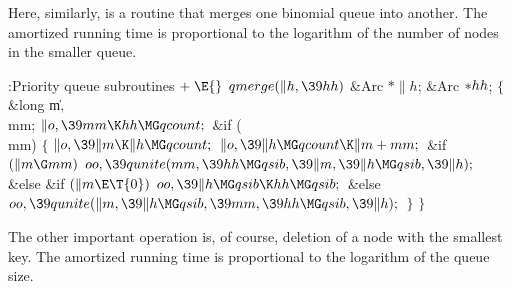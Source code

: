 Here, similarly, is a routine that merges one binomial queue into
another. The amortized running time is proportional to the logarithm
of the number of nodes in the smaller queue.

\Y\B\4:Priority queue subroutines\X${}\mathrel+\E{}$\6
$\\{qmerge}(\|h,\39\\{hh}){}$\1\1\6
\&{Arc} ${}{*}\|h{}$;\6
\&{Arc} ${}{*}\\{hh}{}$;\2%
\2\6
${}\{{}$\5
\1\&{long} \|m${},{}$ \\{mm};\7
${}\|o,\39\\{mm}\K\\{hh}\MG\\{qcount};{}$\6
\&{if} (\\{mm})\5
${}\{{}$\1\6
${}\|o,\39\|m\K\|h\MG\\{qcount};{}$\6
${}\|o,\39\|h\MG\\{qcount}\K\|m+\\{mm};{}$\6
\&{if} ${}(\|m\G\\{mm}){}$\1\5
${}\\{oo},\39\\{qunite}(\\{mm},\39\\{hh}\MG\\{qsib},\39\|m,\39\|h\MG\\{qsib},%
\39\|h);{}$\2\6
\&{else} \&{if} ${}(\|m\E\T{0}){}$\1\5
${}\\{oo},\39\|h\MG\\{qsib}\K\\{hh}\MG\\{qsib};{}$\2\6
\&{else}\1\5
${}\\{oo},\39\\{qunite}(\|m,\39\|h\MG\\{qsib},\39\\{mm},\39\\{hh}\MG\\{qsib},%
\39\|h);{}$\2\6
\4${}\}{}$\2\6
\4${}\}{}$\2\par
\fi

The other important operation is, of course, deletion of a node
with the smallest key. The amortized running time is proportional to
the logarithm of the queue size.

